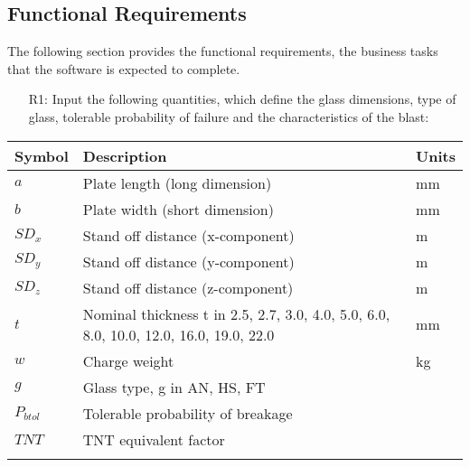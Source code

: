 \documentclass[12pt]{article}
\begin{document}
\subsection{Functional Requirements}
\label{Sec:FR}
The following section provides the functional requirements, the business tasks that the software is expected to complete.
\begin{itemize}
\item[R1:]Input the following quantities, which define the glass dimensions, type of glass, tolerable probability of failure and the characteristics of the blast:
\end{itemize}
\begin{longtable*}{l l l}
\toprule
Symbol & Description & Units
\\
\midrule
$a$ & Plate length (long dimension) & mm
\\
$b$ & Plate width (short dimension) & mm
\\
$SD_{x}$ & Stand off distance (x-component) & m
\\
$SD_{y}$ & Stand off distance (y-component) & m
\\
$SD_{z}$ & Stand off distance (z-component) & m
\\
$t$ & Nominal thickness t in {2.5, 2.7, 3.0, 4.0, 5.0, 6.0, 8.0, 10.0, 12.0, 16.0, 19.0, 22.0} & mm
\\
$w$ & Charge weight & kg
\\
$g$ & Glass type, g in {AN, HS, FT} & 
\\
$P_{btol}$ & Tolerable probability of breakage & 
\\
$TNT$ & TNT equivalent factor & 
\\
\bottomrule
\label{Table:ToS}
\end{longtable*}
\end{document}

